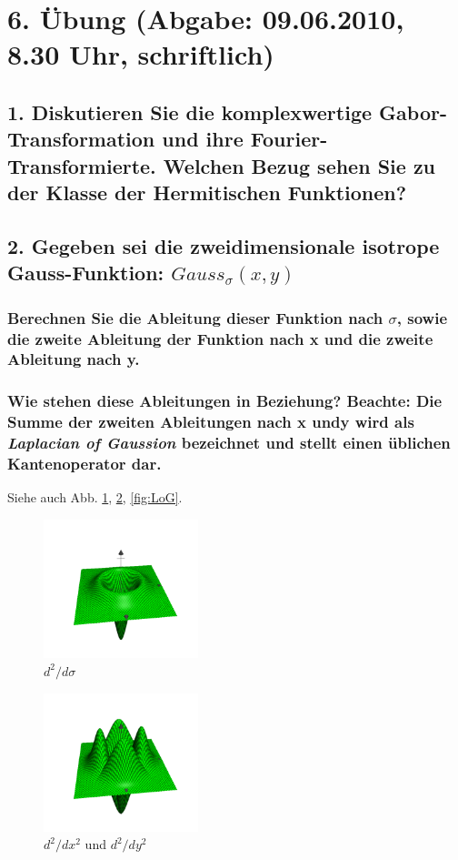 \section*{6. \"Ubung (Abgabe: 09.06.2010, 8.30 Uhr, schriftlich)}

\subsection*{1. Diskutieren Sie die komplexwertige Gabor-Transformation und ihre Fourier-Transformierte. Welchen Bezug sehen Sie zu der Klasse der Hermitischen Funktionen?}

\subsection*{2. Gegeben sei die zweidimensionale isotrope Gauss-Funktion: $Gauss_{\sigma}(x,y)$}
\subsubsection*{Berechnen Sie die Ableitung dieser Funktion nach $\sigma$, sowie die zweite Ableitung der Funktion nach x und die zweite Ableitung nach y.}
\subsubsection*{Wie stehen diese Ableitungen in Beziehung? Beachte: Die Summe der zweiten Ableitungen nach x undy wird als \emph{Laplacian of Gaussion} bezeichnet und stellt einen \"ublichen Kantenoperator dar.}
Siehe auch Abb. \ref{fig:1Abl}, \ref{fig:2Abl}, \ref{fig:LoG}.

\begin{figure}[p] %
   \centering
   \includegraphics[width=0.4\textwidth]{Uebung6/1Abl_sigma.pdf} 
   \caption{$d^{2}/d\sigma$}
   \label{fig:1Abl}
\end{figure}

\begin{figure}[p] %
   \centering
   \includegraphics[width=0.4\textwidth]{Uebung6/2Abl_xy.pdf} 
   \caption{$d^{2}/dx^{2}$ und $d^{2}/dy^{2}$}
   \label{fig:2Abl}
\end{figure}

